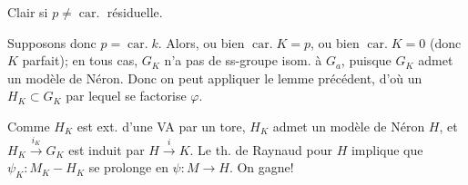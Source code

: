 Clair si $p\ne\operatorname{car.}$ résiduelle.

Supposons donc $p=\operatorname{car.}k$. Alors, ou bien $\operatorname{car.}K=p$, ou bien $\operatorname{car.}K=0$ (donc $K$ parfait); en tous cas, $G_K$ n'a pas de ss-groupe isom. à $G_a$, puisque $G_K$ admet un modèle de Néron. Donc on peut appliquer le lemme précédent,  d'où un $H_K\subset G_K$ par lequel se factorise $\varphi$.

Comme $H_K$ est ext. d'une VA par un tore, $H_K$ admet un modèle de Néron $H$, et $H_K\xrightarrow{i_K}G_K$ est induit par $H\xrightarrow{i}K$. Le th. de Raynaud pour $H$ implique que $\psi_K:M_K\mathbin{-}H_K$ se prolonge en $\psi:M\longrightarrow H$. On gagne!

